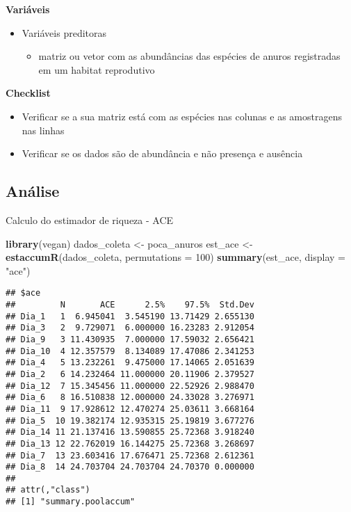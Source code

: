 \documentclass[
]{book}
\newenvironment{Shaded}{\begin{snugshade}}{\end{snugshade}}
\newcommand{\DataTypeTok}[1]{\textcolor[rgb]{0.13,0.29,0.53}{#1}}
\newcommand{\DecValTok}[1]{\textcolor[rgb]{0.00,0.00,0.81}{#1}}
\newcommand{\KeywordTok}[1]{\textcolor[rgb]{0.13,0.29,0.53}{\textbf{#1}}}
\newcommand{\NormalTok}[1]{#1}
\newcommand{\StringTok}[1]{\textcolor[rgb]{0.31,0.60,0.02}{#1}}
\providecommand{\tightlist}{%
  \setlength{\itemsep}{0pt}\setlength{\parskip}{0pt}}
\begin{document}
\textbf{Variáveis}

\begin{itemize}
\tightlist
\item
  Variáveis preditoras

  \begin{itemize}
  \tightlist
  \item
    matriz ou vetor com as abundâncias das espécies de anuros registradas em um habitat reprodutivo
  \end{itemize}
\end{itemize}

\textbf{Checklist}

\begin{itemize}
\tightlist
\item
  Verificar se a sua matriz está com as espécies nas colunas e as amostragens nas linhas
\item
  Verificar se os dados são de abundância e não presença e ausência
\end{itemize}

\hypertarget{anuxe1lise-1}{%
\subsection{Análise}\label{anuxe1lise-1}}

Calculo do estimador de riqueza - ACE

\begin{Shaded}
\begin{Highlighting}[]
\KeywordTok{library}\NormalTok{(vegan)}
\NormalTok{dados_coleta <-}\StringTok{ }\NormalTok{poca_anuros}
\NormalTok{est_ace <-}\StringTok{ }\KeywordTok{estaccumR}\NormalTok{(dados_coleta, }\DataTypeTok{permutations =} \DecValTok{100}\NormalTok{)}
\KeywordTok{summary}\NormalTok{(est_ace, }\DataTypeTok{display =} \StringTok{"ace"}\NormalTok{)}
\end{Highlighting}
\end{Shaded}

\begin{verbatim}
## $ace
##         N       ACE      2.5%    97.5%  Std.Dev
## Dia_1   1  6.945041  3.545190 13.71429 2.655130
## Dia_3   2  9.729071  6.000000 16.23283 2.912054
## Dia_9   3 11.430935  7.000000 17.59032 2.656421
## Dia_10  4 12.357579  8.134089 17.47086 2.341253
## Dia_4   5 13.232261  9.475000 17.14065 2.051639
## Dia_2   6 14.232464 11.000000 20.11906 2.379527
## Dia_12  7 15.345456 11.000000 22.52926 2.988470
## Dia_6   8 16.510838 12.000000 24.33028 3.276971
## Dia_11  9 17.928612 12.470274 25.03611 3.668164
## Dia_5  10 19.382174 12.935315 25.19819 3.677276
## Dia_14 11 21.137416 13.590855 25.72368 3.918240
## Dia_13 12 22.762019 16.144275 25.72368 3.268697
## Dia_7  13 23.603416 17.676471 25.72368 2.612361
## Dia_8  14 24.703704 24.703704 24.70370 0.000000
## 
## attr(,"class")
## [1] "summary.poolaccum"
\end{verbatim}
\end{document}

